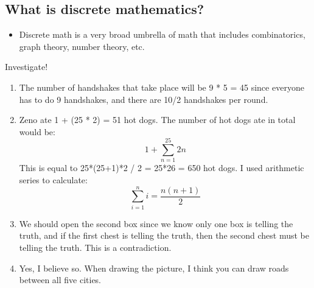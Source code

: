     \subsection{What is discrete mathematics?}
    
    \begin{itemize}
        \item Discrete math is a very broad umbrella of math that includes combinatorics, graph theory, number theory, etc.
    \end{itemize}
    
    \begin{mdframed}Investigate!
        \begin{enumerate}
            \item The number of handshakes that take place will be 9 * 5 = 45 since everyone has to do 9 handshakes, and there are 10/2 handshakes per round.
            \item Zeno ate 1 + (25 * 2) = 51 hot dogs. The number of hot dogs ate in total would be:
            \begin{equation}
                1 + \sum_{n=1}^{25} 2n
            \end{equation}
            This is equal to 25*(25+1)*2 / 2 = 25*26 = 650 hot dogs. I used arithmetic series to calculate: \begin{equation}\sum_{i=1}^{n} i=\frac{n(n+1)}{2}\end{equation}
            \item We should open the second box since we know only one box is telling the truth, and if the first chest is telling the truth, then the second chest must be telling the truth. This is a contradiction.
            \item Yes, I believe so. When drawing the picture, I think you can draw roads between all five cities.
        \end{enumerate}
    \end{mdframed}